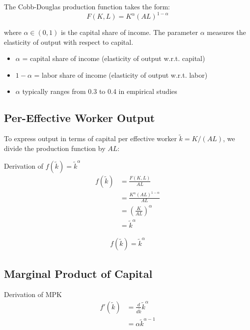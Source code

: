 \documentclass[a4paper,11pt]{article}
\newcommand{\ktilde}{\tilde{k}}
\begin{document}
The Cobb-Douglas production function takes the form:
\[
F(K,L) = K^\alpha (AL)^{1-\alpha}
\]

where $\alpha \in (0,1)$ is the capital share of income. The parameter $\alpha$ measures the elasticity of output with respect to capital.

\medskip
\begin{tcolorbox}[colback=blue!5,colframe=blue3,title=Interpretation of $\alpha$]
\begin{itemize}
    \item $\alpha$ = capital share of income (elasticity of output w.r.t. capital)
    \item $1-\alpha$ = labor share of income (elasticity of output w.r.t. labor)
    \item $\alpha$ typically ranges from 0.3 to 0.4 in empirical studies
\end{itemize}
\end{tcolorbox}

\subsection*{Per-Effective Worker Output}

To express output in terms of capital per effective worker $\ktilde = K/(AL)$, we divide the production function by $AL$:

\begin{derivationbox}{Derivation of $f(\ktilde) = \ktilde^\alpha$}
\begin{align}
f(\ktilde) &= \frac{F(K,L)}{AL} \\
&= \frac{K^\alpha (AL)^{1-\alpha}}{AL} \\
&= \left(\frac{K}{AL}\right)^\alpha \\
&= \ktilde^\alpha
\end{align}
\end{derivationbox}

\begin{resultbox}
\begin{align*}
\boxed{f(\ktilde) = \ktilde^\alpha}
\tag{CD-f}
\end{align*}
\end{resultbox}

\subsection*{Marginal Product of Capital}

\begin{derivationbox}{Derivation of MPK}
\begin{align}
f'(\ktilde) &= \frac{d}{d\ktilde} \ktilde^\alpha \\
&= \alpha \ktilde^{\alpha-1}
\end{align}
\end{derivationbox}
\end{document}
